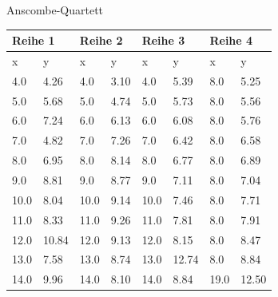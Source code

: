 \begin{example}{Anscombe-Quartett}
    \begin{center}
        \begin{tabular}{|l|l||l|l||l|l||l|l|}
            \hline
            \multicolumn{2}{|l||}{Reihe 1} & \multicolumn{2}{l||}{Reihe 2} & \multicolumn{2}{l||}{Reihe 3} & \multicolumn{2}{l|}{Reihe 4}                               \\ \hline
            x                              & y                             & x                             & y                            & x    & y     & x    & y     \\ \hline\hline
            4.0                            & 4.26                          & 4.0                           & 3.10                         & 4.0  & 5.39  & 8.0  & 5.25  \\ \hline
            5.0                            & 5.68                          & 5.0                           & 4.74                         & 5.0  & 5.73  & 8.0  & 5.56  \\ \hline
            6.0                            & 7.24                          & 6.0                           & 6.13                         & 6.0  & 6.08  & 8.0  & 5.76  \\ \hline
            7.0                            & 4.82                          & 7.0                           & 7.26                         & 7.0  & 6.42  & 8.0  & 6.58  \\ \hline
            8.0                            & 6.95                          & 8.0                           & 8.14                         & 8.0  & 6.77  & 8.0  & 6.89  \\ \hline
            9.0                            & 8.81                          & 9.0                           & 8.77                         & 9.0  & 7.11  & 8.0  & 7.04  \\ \hline
            10.0                           & 8.04                          & 10.0                          & 9.14                         & 10.0 & 7.46  & 8.0  & 7.71  \\ \hline
            11.0                           & 8.33                          & 11.0                          & 9.26                         & 11.0 & 7.81  & 8.0  & 7.91  \\ \hline
            12.0                           & 10.84                         & 12.0                          & 9.13                         & 12.0 & 8.15  & 8.0  & 8.47  \\ \hline
            13.0                           & 7.58                          & 13.0                          & 8.74                         & 13.0 & 12.74 & 8.0  & 8.84  \\ \hline
            14.0                           & 9.96                          & 14.0                          & 8.10                         & 14.0 & 8.84  & 19.0 & 12.50 \\ \hline
        \end{tabular}
    \end{center}


\end{example}
